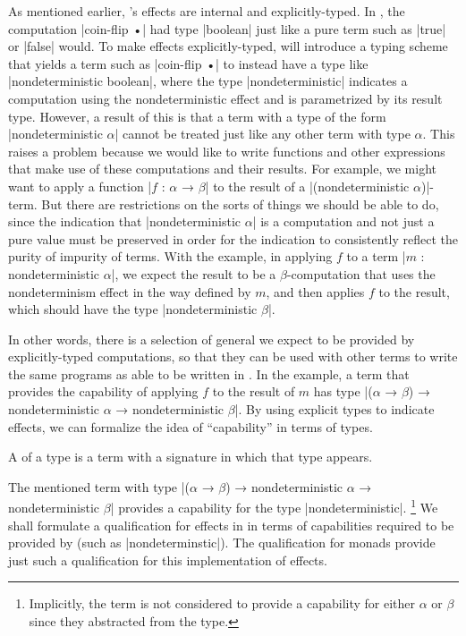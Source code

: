 As mentioned earlier, \LangC's effects are internal and explicitly-typed.
In \LangB, the computation \code|coin-flip •| had type \code|boolean| just like a pure term such as \code|true| or \code|false| would.
To make effects explicitly-typed, \LangC will introduce a typing scheme that yields a term such as \code|coin-flip •| to instead have a type like \code|nondeterministic boolean|, where the type \code|nondeterministic| indicates a computation using the nondeterministic effect and is parametrized by its result type.
However, a result of this is that a term with a type of the form \code|nondeterministic $α$| cannot be treated just like any other term with type $α$.
This raises a problem because we would like to write functions and other expressions that make use of these computations and their results.
For example, we might want to apply a function \code|$f$ : $α$ → $β$| to the result of a \code|(nondeterministic $α$)|-term.
But there are restrictions on the sorts of things we should be able to do, since the indication that \code|nondeterministic $α$| is a computation and not just a pure value must be preserved in order for the indication to consistently reflect the purity of impurity of terms.
With the example, in applying $f$ to a term \code|$m$ : nondeterministic $α$|, we expect the result to be a $β$-computation that uses the nondeterminism effect in the way defined by $m$, and then applies $f$ to the result, which should have the type \code|nondeterministic $β$|.

In other words, there is a selection of general  we expect to be provided by explicitly-typed computations, so that they can be used with other terms to write the same programs as able to be written in \LangB.
In the example, a term that provides the capability of applying $f$ to the result of $m$ has type \code|($α$ → $β$) → nondeterministic $α$ → nondeterministic $β$|.
By using explicit types to indicate effects, we can formalize the idea of ``capability'' in terms of types.
\begin{blockdefinition}
A  of a type is a term with a signature in which that type appears.
\end{blockdefinition}
The mentioned term with type \code|($α$ → $β$) → nondeterministic $α$ → nondeterministic $β$| provides a capability for the type \code|nondeterministic|.%
\footnote{
  Implicitly, the term is not considered to provide a capability for either $α$ or $β$ since they abstracted from the type.
}
We shall formulate a qualification for effects in \LangC in terms of capabilities required to be provided by  (such as \code|nondeterminstic|).
The qualification for monads provide just such a qualification for this implementation of effects.

